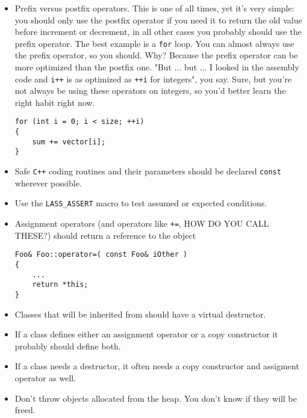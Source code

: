 \documentclass[10pt,a4paper,titlepage,dutch]{report}
\begin{document}
\begin{itemize}

\item Prefix versus postfix operators. This is one of all times, yet
it's very simple: you should only use the postfix operator if you
need it to return the old value before increment or decrement, in
all other cases you probably should use the prefix operator.  The
best example is a \verb|for| loop.  You can almost always use the
prefix operator, so you should.  Why?  Because the prefix operator
can be more optimized than the postfix one.  "But ... but ... I
looked in the assembly code and \verb|i++| is as optimized as
\verb|++i| for integers", you say.  Sure, but you're not always be
using these operators on integers, so you'd better learn the right
habit right now.

\verb|for (int i = 0; i < size; ++i)|\\
\verb|{|\\
\verb|    sum += vector[i];|\\
\verb|}|

\item Safe \verb|C++| coding routines and their parameters should be
declared \verb|const| wherever possible.

\item Use the \verb|LASS_ASSERT| macro to test assumed or expected
conditions.

\item Assignment operators (and operators like \verb|+=|, HOW DO YOU
CALL THESE?) should return a reference to the object

\verb|Foo& Foo::operator=( const Foo& iOther )|\\
\verb|{|\\
\verb|    ...|\\
\verb|    return *this;|\\
\verb|}|

\item Classes that will be inherited from should have a virtual
destructor.

\item If a class defines either an assignment operator or a copy
constructor it probably should define both.

\item If a class needs a destructor, it often needs a copy constructor
and assigment operator as well.

\item Don't throw objects allocated from the heap. You don't know if
they will be freed.


\end{itemize}
\end{document}
